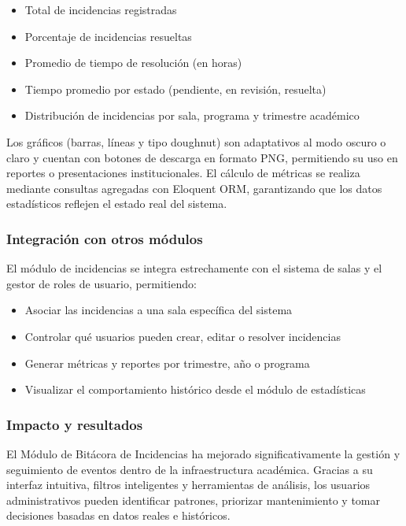 \begin{itemize}
    \item Total de incidencias registradas
    \item Porcentaje de incidencias resueltas
    \item Promedio de tiempo de resolución (en horas)
    \item Tiempo promedio por estado (pendiente, en revisión, resuelta)
    \item Distribución de incidencias por sala, programa y trimestre académico
\end{itemize}

Los gráficos (barras, líneas y tipo doughnut) son adaptativos al modo oscuro o claro y cuentan con botones de descarga en formato PNG, permitiendo su uso en reportes o presentaciones institucionales. El cálculo de métricas se realiza mediante consultas agregadas con Eloquent ORM, garantizando que los datos estadísticos reflejen el estado real del sistema.

\subsubsection{Integración con otros módulos}

El módulo de incidencias se integra estrechamente con el sistema de salas y el gestor de roles de usuario, permitiendo:

\begin{itemize}
    \item Asociar las incidencias a una sala específica del sistema
    \item Controlar qué usuarios pueden crear, editar o resolver incidencias
    \item Generar métricas y reportes por trimestre, año o programa
    \item Visualizar el comportamiento histórico desde el módulo de estadísticas
\end{itemize}

\subsubsection{Impacto y resultados}

El Módulo de Bitácora de Incidencias ha mejorado significativamente la gestión y seguimiento de eventos dentro de la infraestructura académica. Gracias a su interfaz intuitiva, filtros inteligentes y herramientas de análisis, los usuarios administrativos pueden identificar patrones, priorizar mantenimiento y tomar decisiones basadas en datos reales e históricos.

